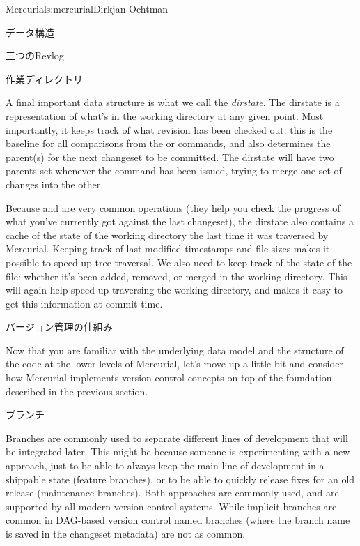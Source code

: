\begin{aosachapter}{Mercurial}{s:mercurial}{Dirkjan Ochtman}
\begin{aosasect1}{データ構造}
\begin{aosasect2}{三つのRevlog}
\end{aosasect2}

\begin{aosasect2}{作業ディレクトリ}

A final important data structure is what we call the
\emph{dirstate}. The dirstate is a representation of what's in the
working directory at any given point. Most importantly, it keeps track
of what revision has been checked out: this is the baseline for all
comparisons from the  or  commands, and also
determines the parent(s) for the next changeset to be committed. The
dirstate will have two parents set whenever the  command
has been issued, trying to merge one set of changes into the other.

Because  and  are very common operations (they
help you check the progress of what you've currently got against the
last changeset), the dirstate also contains a cache of the state of
the working directory the last time it was traversed by Mercurial.
Keeping track of last modified timestamps and file sizes makes it
possible to speed up tree traversal. We also need to keep track of the
state of the file: whether it's been added, removed, or merged in the
working directory. This will again help speed up traversing the
working directory, and makes it easy to get this information at commit
time.

\end{aosasect2}

\end{aosasect1}

\begin{aosasect1}{バージョン管理の仕組み}

Now that you are familiar with the underlying data model and the
structure of the code at the lower levels of Mercurial, let's move up
a little bit and consider how Mercurial implements version control
concepts on top of the foundation described in the previous section.

\begin{aosasect2}{ブランチ}

Branches are commonly used to separate different lines of development
that will be integrated later. This might be because someone is
experimenting with a new approach, just to be able to always keep the
main line of development in a shippable state (feature branches), or
to be able to quickly release fixes for an old release (maintenance
branches). Both approaches are commonly used, and are supported by all
modern version control systems. While implicit branches are common in
DAG-based version control named branches (where the branch name is
saved in the changeset metadata) are not as common.


\end{aosasect2}
\end{aosasect1}
\end{aosachapter}
